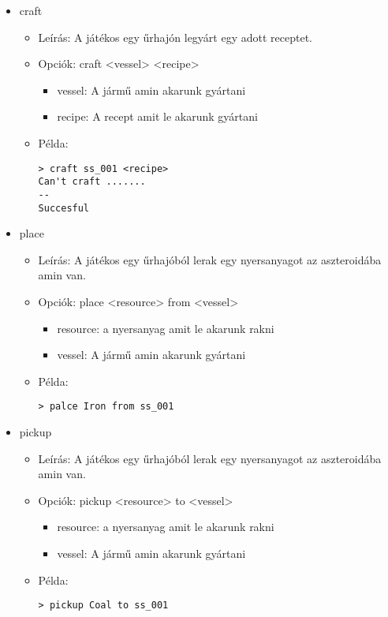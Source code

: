 \documentclass[../../projlab]{subfiles}
\begin{document}
\begin{itemize}
    \item craft
    \begin{itemize}
        \item Leírás: A játékos egy űrhajón legyárt egy adott receptet.
        \item Opciók: craft <vessel> <recipe>
        \begin{itemize}
            \item vessel: A jármű amin akarunk gyártani
            \item recipe: A recept amit le akarunk gyártani
        \end{itemize}
        \item Példa:
            \begin{verbatim}
> craft ss_001 <recipe>
Can't craft .......
--
Succesful
            \end{verbatim}
    \end{itemize}


    \item place
    \begin{itemize}
        \item Leírás: A játékos egy űrhajóból lerak egy nyersanyagot az aszteroidába amin van.
        \item Opciók: place <resource> from <vessel>
        \begin{itemize}
            \item resource: a nyersanyag amit le akarunk rakni
            \item vessel: A jármű amin akarunk gyártani
        \end{itemize}
        \item Példa:
            \begin{verbatim}
> palce Iron from ss_001
            \end{verbatim}
    \end{itemize}

    \item pickup
    \begin{itemize}
        \item Leírás: A játékos egy űrhajóból lerak egy nyersanyagot az aszteroidába amin van.
        \item Opciók: pickup <resource> to <vessel>
        \begin{itemize}
            \item resource: a nyersanyag amit le akarunk rakni
            \item vessel: A jármű amin akarunk gyártani
        \end{itemize}
        \item Példa:
            \begin{verbatim}
> pickup Coal to ss_001
            \end{verbatim}
    \end{itemize}
\end{itemize}
\end{document}
